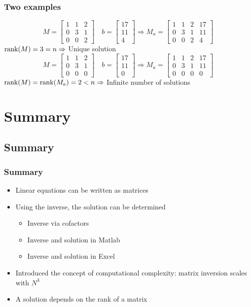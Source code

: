 \begin{frame}[fragile]
  \frametitle{Two examples}
  \[
    M=
    \begin{bmatrix}
      1 & 1 & 2\\
      0 & 3 & 1\\
      0 & 0 & 2
    \end{bmatrix}\quad
    b=
    \begin{bmatrix}
      17\\11\\4
    \end{bmatrix}
    \Rightarrow
    M_a=
    \begin{bmatrix}
      1 & 1 & 2 & 17\\
      0 & 3 & 1 & 11\\
      0 & 0 & 2 & 4
    \end{bmatrix}
  \]
  $\operatorname{rank}(M)=3=n \Rightarrow $ Unique solution \pause \\ \vfill
    \[
    M=
    \begin{bmatrix}
      1 & 1 & 2\\
      0 & 3 & 1\\
      0 & 0 & 0
    \end{bmatrix}\quad
    b=
    \begin{bmatrix}
      17\\11\\0
    \end{bmatrix}
    \Rightarrow
    M_a=
    \begin{bmatrix}
      1 & 1 & 2 & 17\\
      0 & 3 & 1 & 11\\
      0 & 0 & 0 & 0
    \end{bmatrix}
  \]
  $\operatorname{rank}(M)=\operatorname{rank}(M_a)=2<n \Rightarrow $ Infinite number of solutions
\end{frame} 

\section{Summary}
\subsection*{Summary}

\begin{frame}[fragile]
  \frametitle{Summary}
  \begin{itemize}
    \item Linear equations can be written as matrices
    \item Using the inverse, the solution can be determined
    \begin{itemize}
      \item Inverse via cofactors
      \item Inverse and solution in Matlab
      \item Inverse and solution in Excel
    \end{itemize}
    \item Introduced the concept of computational complexity: matrix inversion scales with $N^3$
    \item A solution depends on the rank of a matrix
  \end{itemize}
\end{frame}